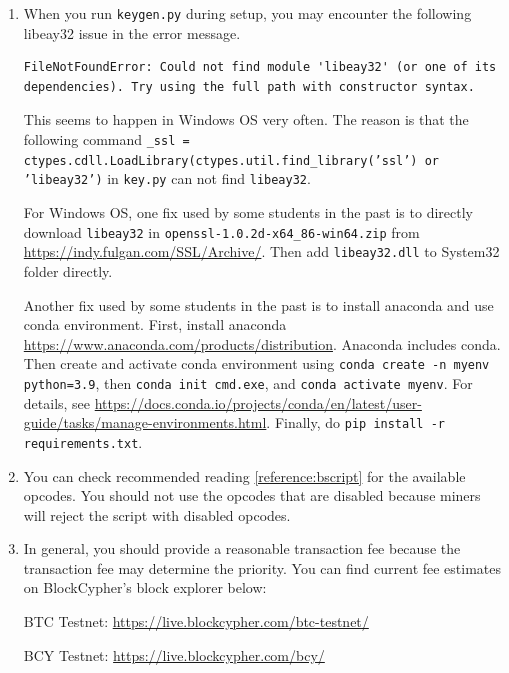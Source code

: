 \documentclass[11pt]{article}
\begin{document}
\begin{enumerate}
\item When you run \texttt{keygen.py} during setup, you may encounter the following libeay32 issue in the error message. 

\begin{verbatim}
FileNotFoundError: Could not find module 'libeay32' (or one of its 
dependencies). Try using the full path with constructor syntax. 
\end{verbatim}

This seems to happen in Windows OS very often. The reason is  that the following command \texttt{\_ssl = ctypes.cdll.LoadLibrary(ctypes.util.find\_library('ssl') or 'libeay32')} in \texttt{key.py} can not find \texttt{libeay32}. 

For Windows OS, one fix used by some students in the past is to directly download \texttt{libeay32} in \texttt{openssl-1.0.2d-x64\_86-win64.zip}  from \href{https://indy.fulgan.com/SSL/Archive/}{https://indy.fulgan.com/SSL/Archive/}. Then add \texttt{libeay32.dll} to System32 folder directly. 

Another fix used by some students in the past is to install anaconda and use conda environment. First, install anaconda \href{https://www.anaconda.com/products/distribution}{https://www.anaconda.com/products/distribution}. Anaconda includes conda. Then create and activate conda environment using \texttt{conda create -n myenv python=3.9}, then \texttt{conda init cmd.exe}, and \texttt{conda activate myenv}. For details, see \href{https://docs.conda.io/projects/conda/en/latest/user-guide/tasks/manage-environments.html}{https://docs.conda.io/projects/conda/en/latest/user-guide/tasks/manage-environments.html}. Finally, do \texttt{pip install -r requirements.txt}.


\item You can check recommended reading \ref{reference:bscript} for the available opcodes. You should not use the opcodes that are disabled because miners will reject the script with disabled opcodes. 

\item In general, you should provide a reasonable transaction fee because the transaction fee may determine the priority. You can find current fee estimates on BlockCypher's block explorer below:

BTC Testnet: \href{https://live.blockcypher.com/btc-testnet/}{https://live.blockcypher.com/btc-testnet/}

BCY Testnet: \href{https://live.blockcypher.com/bcy/}{https://live.blockcypher.com/bcy/}


\end{enumerate}
\end{document}
